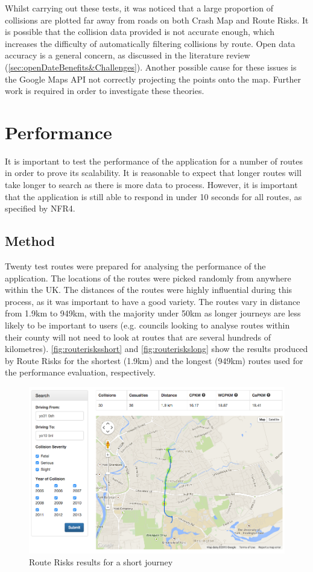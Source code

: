 \documentclass[authoryearcitations]{UoYCSproject}
\begin{document}
Whilst carrying out these tests, it was noticed that a large proportion of collisions are plotted far away from roads on both Crash Map and Route Risks. It is possible that the collision data provided is not accurate enough, which increases the difficulty of automatically filtering collisions by route. Open data accuracy is a general concern, as discussed in the literature review (\autoref{sec:openDateBenefits&Challenges}). Another possible cause for these issues is the Google Maps API not correctly projecting the points onto the map. Further work is required in order to investigate these theories.

\section{Performance}

It is important to test the performance of the application for a number of routes in order to prove its scalability. It is reasonable to expect that longer routes will take longer to search as there is more data to process. However, it is important that the application is still able to respond in under 10 seconds for all routes, as specified by NFR4. 

\subsection{Method}

Twenty test routes were prepared for analysing the performance of the application. The locations of the routes were picked randomly from anywhere within the UK. The distances of the routes were highly influential during this process, as it was important to have a good variety. The routes vary in distance from 1.9km to 949km, with the majority under 50km as longer journeys are less likely to be important to users (e.g. councils looking to analyse routes within their county will not need to look at routes that are several hundreds of kilometres). \autoref{fig:routerisksshort} and \autoref{fig:routeriskslong} show the results produced by Route Risks for the shortest (1.9km) and the longest (949km) routes used for the performance evaluation, respectively.


\begin{figure}
	\center
	\includegraphics[scale=0.45]{routerisksshortdist}
	\caption{Route Risks results for a short journey}
	\label{fig:routerisksshort}
\end{figure}
\end{document}
